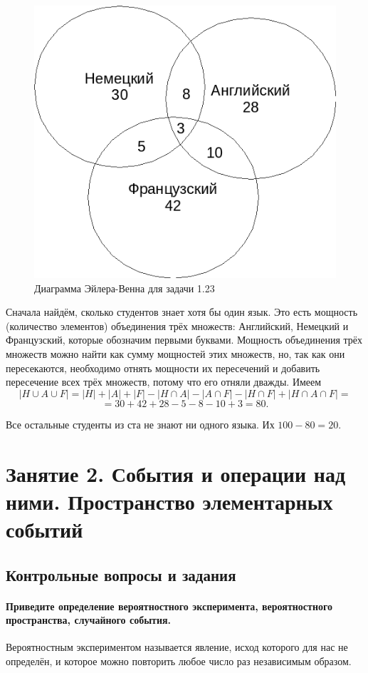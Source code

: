 \documentclass{book}
\begin{document}
\begin{figure}[h!]
  \centering
  \includegraphics[width=.4\textwidth]{./pictures/1_23.png}
  \caption{Диаграмма Эйлера-Венна для задачи 1.23}
  \label{fig:123}
\end{figure}

Сначала найдём, сколько студентов знает хотя бы один язык. Это есть мощность (количество элементов) объединения трёх множеств: Английский, Немецкий и Французский, которые обозначим первыми буквами. Мощность объединения трёх множеств можно найти как сумму мощностей этих множеств, но, так как они пересекаются, необходимо отнять мощности их пересечений и добавить пересечение всех трёх множеств, потому что его отняли дважды. Имеем $$|H\cup A\cup F|=|H|+|A|+|F|-|H\cap A|-|A\cap F|-|H\cap F|+|H\cap A\cap F|=$$$$=30+42+28-5-8-10+3=80.$$

Все остальные студенты из ста не знают ни одного языка. Их $100-80=20$.

\chapter*{Занятие 2. События и операции над ними. Пространство элементарных событий}

\section*{Контрольные вопросы и задания}

\subsubsection*{Приведите определение вероятностного эксперимента, вероятностного пространства, случайного события.}

Вероятностным экспериментом называется явление, исход которого для нас не определён, и которое можно повторить любое число раз независимым образом.
\end{document}
